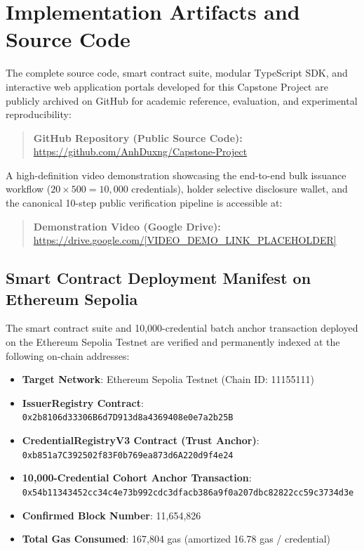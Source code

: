 
\chapter{Implementation Artifacts and Source Code}
\label{app:resources}

The complete source code, smart contract suite, modular TypeScript SDK, and interactive web application portals developed for this Capstone Project are publicly archived on GitHub for academic reference, evaluation, and experimental reproducibility:

\begin{quote}
\textbf{GitHub Repository (Public Source Code):}\\
\url{https://github.com/AnhDuxng/Capstone-Project}
\end{quote}

A high-definition video demonstration showcasing the end-to-end bulk issuance workflow ($20 \times 500 = 10,000$ credentials), holder selective disclosure wallet, and the canonical 10-step public verification pipeline is accessible at:

\begin{quote}
\textbf{Demonstration Video (Google Drive):}\\
\url{https://drive.google.com/[VIDEO_DEMO_LINK_PLACEHOLDER]} %
\end{quote}

\section{Smart Contract Deployment Manifest on Ethereum Sepolia}

The smart contract suite and 10,000-credential batch anchor transaction deployed on the Ethereum Sepolia Testnet are verified and permanently indexed at the following on-chain addresses:

\begin{itemize}
    \item \textbf{Target Network}: Ethereum Sepolia Testnet (Chain ID: 11155111)
    \item \textbf{IssuerRegistry Contract}:\\
    \texttt{0x2b8106d33306B6d7D913d8a4369408e0e7a2b25B}
    \item \textbf{CredentialRegistryV3 Contract (Trust Anchor)}:\\
    \texttt{0xb851a7C392502f83F0b769ea873d6A220d9f4e24}
    \item \textbf{10,000-Credential Cohort Anchor Transaction}:\\
    \texttt{0x54b11343452cc34c4e73b992cdc3dfacb386a9f0a207dbc82822cc59c3734d3e}
    \item \textbf{Confirmed Block Number}: 11,654,826
    \item \textbf{Total Gas Consumed}: 167,804 gas (amortized 16.78 gas / credential)
\end{itemize}


